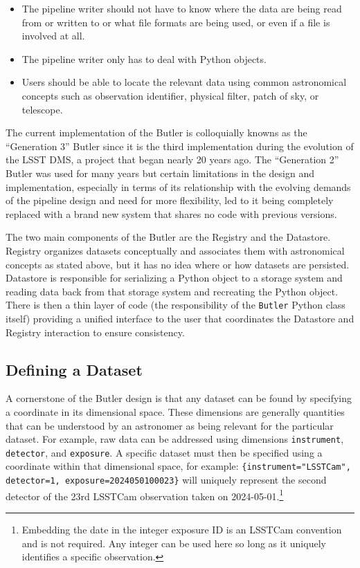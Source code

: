 \documentclass[]{spie}
\begin{document}
\begin{itemize}
\item The pipeline writer should not have to know where the data are being read from or written to or what file formats are being used, or even if a file is involved at all.
\item The pipeline writer only has to deal with Python objects.
\item Users should be able to locate the relevant data using common astronomical concepts such as observation identifier, physical filter, patch of sky, or telescope.
\end{itemize}

The current implementation of the Butler is colloquially knowns as the ``Generation 3'' Butler since it is the third implementation during the evolution of the LSST DMS, a project that began nearly 20 years ago.\cite{2006SPIE.6274E..0PK}
The ``Generation 2'' Butler was used for many years but certain limitations in the design and implementation, especially in terms of its relationship with the evolving demands of the pipeline design and need for more flexibility, led to it being completely replaced with a brand new system that shares no code with previous versions.

The two main components of the Butler are the Registry and the Datastore.
Registry organizes datasets conceptually and associates them with astronomical concepts as stated above, but it has no idea where or how datasets are persisted.
Datastore is responsible for serializing a Python object to a storage system and reading data back from that storage system and recreating the Python object.
There is then a thin layer of code (the responsibility of the \texttt{Butler} Python class itself) providing a unified interface to the user that coordinates the Datastore and Registry interaction to ensure consistency.

\subsection{Defining a Dataset}

A cornerstone of the Butler design is that any dataset can be found by specifying a coordinate in its dimensional space.
These dimensions are generally quantities that can be understood by an astronomer as being relevant for the particular dataset.
For example, raw data can be addressed using dimensions \texttt{instrument}, \texttt{detector}, and \texttt{exposure}.
A specific dataset must then be specified using a coordinate within that dimensional space, for example: \texttt{\{instrument="LSSTCam", detector=1, exposure=2024050100023\}} will uniquely represent the second detector of the 23rd LSSTCam observation taken on 2024-05-01.\footnote{Embedding the date in the integer exposure ID is an LSSTCam convention and is not required. Any integer can be used here so long as it uniquely identifies a specific observation.}
\end{document}
